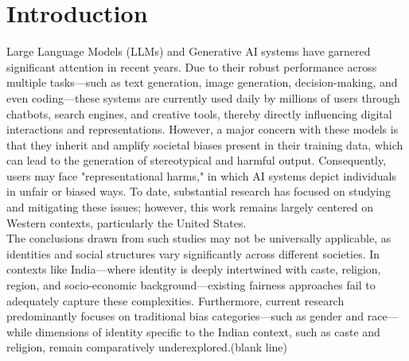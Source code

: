 \documentclass[sigplan,screen]{acmart}
\begin{document}
\section{Introduction}
Large Language Models (LLMs) and Generative AI systems have garnered significant attention in recent years. Due to their robust performance across multiple tasks—such as text generation, image generation, decision-making, and even coding—these systems are currently used daily by millions of users through chatbots, search engines, and creative tools, thereby directly influencing digital interactions and representations. However, a major concern with these models is that they inherit and amplify societal biases present in their training data, which can lead to the generation of stereotypical and harmful output. Consequently, users may face "representational harms," in which AI systems depict individuals in unfair or biased ways. To date, substantial research has focused on studying and mitigating these issues; however, this work remains largely centered on Western contexts, particularly the United States.\\
The conclusions drawn from such studies may not be universally applicable, as identities and social structures vary significantly across different societies. In contexts like India—where identity is deeply intertwined with caste, religion, region, and socio-economic background—existing fairness approaches fail to adequately capture these complexities. Furthermore, current research predominantly focuses on traditional bias categories—such as gender and race—while dimensions of identity specific to the Indian context, such as caste and religion, remain comparatively underexplored.(blank line)
\end{document}
